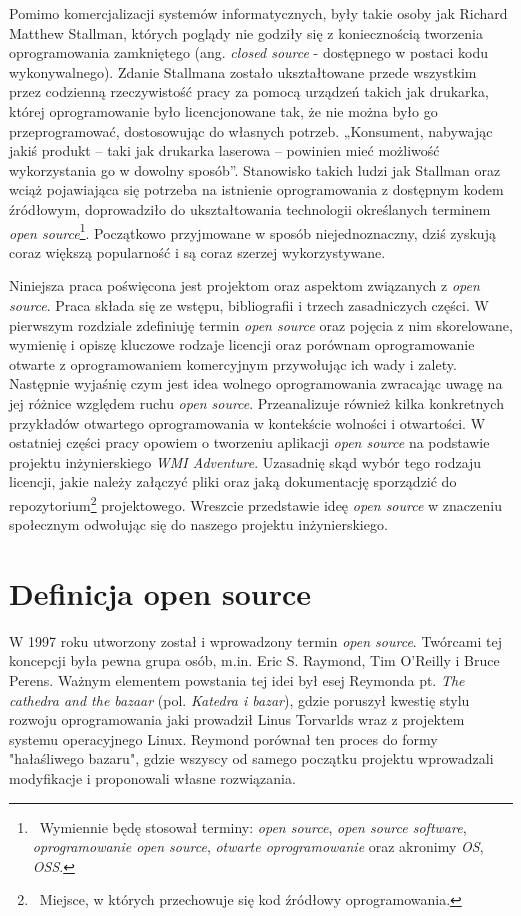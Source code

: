 \documentclass{article}
\begin{document}
Pomimo komercjalizacji systemów informatycznych, były takie osoby jak Richard Matthew Stallman, których poglądy nie godziły się z koniecznością tworzenia oprogramowania zamkniętego (ang. \emph{closed source} - dostępnego w postaci kodu wykonywalnego). Zdanie Stallmana zostało ukształtowane przede wszystkim przez codzienną rzeczywistość pracy za pomocą urządzeń takich jak drukarka, której oprogramowanie było licencjonowane tak, że nie można było go przeprogramować, dostosowując do własnych potrzeb. „Konsument, nabywając jakiś produkt – taki jak drukarka laserowa – powinien mieć możliwość wykorzystania go w dowolny sposób”\cite{Kotula}. Stanowisko takich ludzi jak Stallman oraz wciąż pojawiająca się potrzeba na istnienie oprogramowania z dostępnym kodem źródłowym, doprowadziło do ukształtowania technologii określanych terminem \emph{open source}\footnote{\, Wymiennie będę stosował terminy: \emph{open source}, \emph{open source software}, \emph{oprogramowanie open source}, \emph{otwarte oprogramowanie} oraz akronimy \emph{OS}, \emph{OSS}.}. Początkowo przyjmowane w sposób niejednoznaczny, dziś zyskują coraz większą popularność i są coraz szerzej wykorzystywane\cite{Kotula}. 

Niniejsza praca poświęcona jest projektom oraz aspektom związanych z \emph{open source}. Praca składa się ze wstępu, bibliografii i trzech zasadniczych części. W pierwszym rozdziale zdefiniuję termin \emph{open source} oraz pojęcia z nim skorelowane, wymienię i opiszę kluczowe rodzaje licencji oraz porównam oprogramowanie otwarte z oprogramowaniem komercyjnym przywołując ich wady i zalety. Następnie wyjaśnię czym jest idea wolnego oprogramowania zwracając uwagę na jej różnice względem ruchu \emph{open source}. Przeanalizuje również kilka konkretnych przykładów otwartego oprogramowania w kontekście wolności i otwartości. W ostatniej części pracy opowiem o tworzeniu aplikacji \emph{open source} na podstawie projektu inżynierskiego \emph{WMI Adventure}. Uzasadnię skąd wybór tego rodzaju licencji, jakie należy załączyć pliki oraz jaką dokumentację sporządzić do repozytorium\footnote{\, Miejsce, w których przechowuje się kod źródłowy oprogramowania.} projektowego. Wreszcie przedstawie ideę \emph{open source} w znaczeniu społecznym odwołując się do naszego projektu inżynierskiego.

\section{Definicja open source}

\hspace{4mm} W 1997 roku utworzony został i wprowadzony termin \emph{open source}. Twórcami tej koncepcji była pewna grupa osób, m.in. Eric S. Raymond, Tim O'Reilly i Bruce Perens. Ważnym elementem powstania tej idei był esej Reymonda pt. \emph{The cathedra and the bazaar} (pol. \emph{Katedra i bazar}), gdzie poruszył kwestię stylu rozwoju oprogramowania jaki prowadził Linus Torvarlds wraz z projektem systemu operacyjnego Linux. Reymond porównał ten proces do formy "hałaśliwego bazaru", gdzie wszyscy od samego początku projektu wprowadzali modyfikacje i proponowali własne rozwiązania\cite{Kotula}.  
\end{document}
